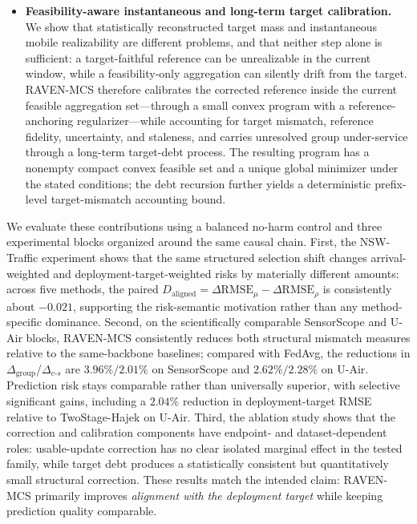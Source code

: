 \documentclass[letterpaper,journal]{IEEEtran}
\begin{document}
\begin{itemize}
    \item \textbf{Feasibility-aware instantaneous and long-term target
    calibration.}
    We show that statistically reconstructed target mass and instantaneous
    mobile realizability are different problems, and that neither step alone is
    sufficient: a target-faithful reference can be unrealizable in the current
    window, while a feasibility-only aggregation can silently drift from the
    target.  RAVEN-MCS therefore calibrates the corrected reference inside the
    current feasible aggregation set---through a small convex program with a
    reference-anchoring regularizer---while accounting for target mismatch,
    reference fidelity, uncertainty, and staleness, and carries unresolved group
    under-service through a long-term target-debt process.  The resulting
    program has a nonempty compact convex feasible set and a unique global
    minimizer under the stated conditions; the debt recursion further yields a
    deterministic prefix-level target-mismatch accounting bound.
\end{itemize}

We evaluate these contributions using a balanced no-harm control and three
experimental blocks organized around the same causal chain.  First, the
NSW-Traffic experiment shows that the same structured selection shift changes
arrival-weighted and deployment-target-weighted risks by materially different
amounts: across five methods, the paired
$D_{\mathrm{aligned}}=\Delta\mathrm{RMSE}_{\mu}
-\Delta\mathrm{RMSE}_{\rho}$ is consistently about $-0.021$, supporting the
risk-semantic motivation rather than any method-specific dominance.  Second,
on the scientifically comparable SensorScope and U-Air blocks, RAVEN-MCS
consistently reduces both structural mismatch measures relative to the
same-backbone baselines; compared with FedAvg, the reductions in
$\Delta_{\mathrm{group}}$/$\Delta_{c\text{-}s}$ are
$3.96\%/2.01\%$ on SensorScope and $2.62\%/2.28\%$ on U-Air.
Prediction risk stays comparable rather than universally superior, with
selective significant gains, including a $2.04\%$ reduction in
deployment-target RMSE relative to TwoStage-Hajek on U-Air.  Third, the
ablation study shows that the correction and calibration components have
endpoint- and dataset-dependent roles: usable-update correction has no clear
isolated marginal effect in the tested family, while target debt produces a
statistically consistent but quantitatively small structural correction.
These results match the intended claim: RAVEN-MCS primarily improves
\emph{alignment with the deployment target} while keeping prediction quality
comparable.
\end{document}
